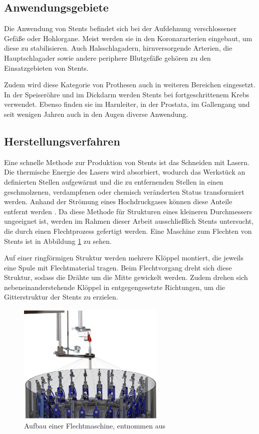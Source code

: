 \subsection{Anwendungsgebiete}
Die Anwendung von Stents befindet sich bei der Aufdehnung verschlossener Gefäße oder Hohlorgane. Meist werden sie in den Koronararterien eingebaut, um diese zu stabilisieren. Auch Halsschlagadern, hirnversorgende Arterien, die Hauptschlagader sowie andere periphere Blutgefäße gehören zu den Einsatzgebieten von Stents. \cite{stent_def}

\mypar Zudem wird diese Kategorie von Prothesen auch in weiteren Bereichen eingesetzt. In der Speiseröhre und im Dickdarm werden Stents bei fortgeschrittenem Krebs verwendet. Ebenso finden sie im Harnleiter, in der Prostata, im Gallengang und seit wenigen Jahren auch in den Augen diverse Anwendung. 


\subsection{Herstellungsverfahren}
Eine schnelle Methode zur Produktion von Stents ist das Schneiden mit Lasern. Die thermische Energie des Lasers wird absorbiert, wodurch das Werkstück an definierten Stellen aufgewärmt und die zu entfernenden Stellen in einen geschmolzenen, verdampfenen oder chemisch veränderten Status transformiert werden. Anhand der Strömung eines Hochdruckgases können diese Anteile entfernt werden \cite{laser_cutting}. Da diese Methode für Strukturen eines kleineren Durchmessers ungeeignet ist, werden im Rahmen dieser Arbeit ausschließlich Stents untersucht, die durch einen Flechtprozess gefertigt werden. Eine Maschine zum Flechten von Stents ist in Abbildung \ref{fig:aufbau_flechten} zu sehen.

\mypar Auf einer ringförmigen Struktur werden mehrere Klöppel montiert, die jeweils eine Spule mit Flechtmaterial tragen. Beim Flechtvorgang dreht sich diese Struktur, sodass die Drähte um die Mitte gewickelt werden. Zudem drehen sich nebeneinanderstehende Klöppel in entgegengesetzte Richtungen, um die Gitterstruktur der Stents zu erzielen. \cite{flechten}

\begin{figure}[h!]
\centering
\includegraphics[width=7cm]{98_images/Flechtmaschine.png}
\caption{Aufbau einer Flechtmaschine, entnommen aus  \cite{flechtmaschine}}
\label{fig:aufbau_flechten}
\end{figure}


